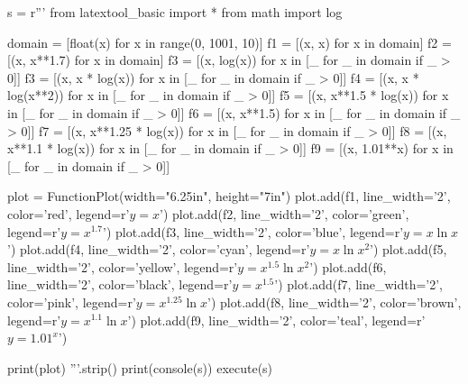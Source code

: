 \newpage
\begin{python}
s = r'''
from latextool_basic import *
from math import log

domain = [float(x) for x in range(0, 1001, 10)]
f1 = [(x, x) for x in domain]
f2 = [(x, x**1.7) for x in domain]
f3 = [(x, log(x)) for x in [_ for _ in domain if _ > 0]]
f3 = [(x, x * log(x)) for x in [_ for _ in domain if _ > 0]]
f4 = [(x, x * log(x**2)) for x in [_ for _ in domain if _ > 0]]
f5 = [(x, x**1.5 * log(x)) for x in [_ for _ in domain if _ > 0]]
f6 = [(x, x**1.5) for x in [_ for _ in domain if _ > 0]]
f7 = [(x, x**1.25 * log(x)) for x in [_ for _ in domain if _ > 0]]
f8 = [(x, x**1.1 * log(x)) for x in [_ for _ in domain if _ > 0]]
f9 = [(x, 1.01**x) for x in [_ for _ in domain if _ > 0]]

plot = FunctionPlot(width="6.25in", height="7in")
plot.add(f1, line_width='2', color='red', legend=r'$y = x$')
plot.add(f2, line_width='2', color='green', legend=r'$y = x^{1.7}$')
plot.add(f3, line_width='2', color='blue', legend=r'$y = x \ln x$')
plot.add(f4, line_width='2', color='cyan', legend=r'$y = x \ln x^2$')
plot.add(f5, line_width='2', color='yellow', legend=r'$y = x^{1.5} \ln x^2$')
plot.add(f6, line_width='2', color='black', legend=r'$y = x^{1.5}$')
plot.add(f7, line_width='2', color='pink', legend=r'$y = x^{1.25} \ln x$')
plot.add(f8, line_width='2', color='brown', legend=r'$y = x^{1.1} \ln x$')
plot.add(f9, line_width='2', color='teal', legend=r'$y = 1.01^x$')

print(plot)
'''.strip()
print(console(s))
execute(s)
\end{python}
